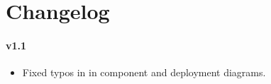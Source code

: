 \chapter*{Changelog}
\subsubsection{v1.1}
\begin{itemize}
\item Fixed typos in in component and deployment diagrams.
\end{itemize}
